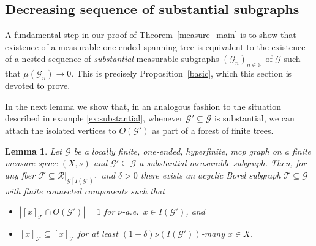 \documentclass[letterpaper,11pt,reqno]{amsart}
\theoremstyle{bfnote}
\newtheorem{lemma}[theorem]{Lemma}
\theoremstyle{definition}
\newcommand{\0}{\varnothing}
\numberwithin{equation}{section}
\begin{document}
\subsection{Decreasing sequence of substantial subgraphs}\label{sec:substantial}

A fundamental step in our proof of Theorem~\ref{measure_main} is to show that existence of a measurable one-ended spanning tree is equivalent to the existence  of a nested sequence of \emph{substantial} measurable subgraphs $(\mathcal G_n)_{n\in \mathbb N}$ of $\mathcal{G}$ such that $\mu(\mathcal{G}_n)\to0$. This is precisely Proposition~\ref{basic}, which this section is devoted to prove. 



In the next lemma we show that, in an analogous fashion to the situation described in example \ref{ex:substantial}, whenever $\mathcal{G}' \subseteq \mathcal{G}$ is substantial, we can attach the isolated vertices to $O( \mathcal{G}')$ as part of a forest of finite trees. 

\begin{lemma}\label{lem:technical}
    Let $\mathcal{G}$ be a locally finite, one-ended, hyperfinite, mcp graph on a finite measure space $(X,\nu)$ and $\mathcal{G}' \subseteq \mathcal{G}$ a substantial measurable subgraph. Then, for any fber $\mathcal{F} \subseteq \mathcal{R}|_{\mathcal G[I(\mathcal G')]}$ and $\delta > 0$ there exists an acyclic Borel subgraph $\mathcal{T} \subseteq \mathcal{G}$ with finite connected components such that 
    \begin{itemize}
        \item[i)] $|[x]_{\mathcal{T}} \cap O(\mathcal{G}')| = 1$ for $\nu$-a.e.\ $x\in I(\mathcal{G}')$, and
        \item[ii)] $[x]_\mathcal{F} \subseteq [x]_{\mathcal{T}}$ for at least $(1 - \delta) \nu (I(\mathcal{G}'))$-many $x\in X$.
    \end{itemize}
\end{lemma}
\end{document}
